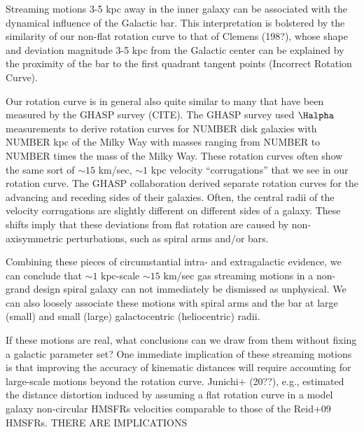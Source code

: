 Streaming motions 3-5 kpc away in the inner galaxy can be associated with the dynamical influence of the Galactic bar. 
This interpretation is bolstered by the similarity of our non-flat rotation curve to that of Clemens (198?), whose shape and deviation magnitude 3-5 kpc from the Galactic center can be explained by the proximity of the bar to the first quadrant tangent points (Incorrect Rotation Curve). 

Our rotation curve is in general also quite similar to many that have been measured by the GHASP survey (CITE). 
The GHASP survey used $\Halpha$ measurements to derive rotation curves for NUMBER disk galaxies with NUMBER kpc of the Milky Way with masses ranging from NUMBER to NUMBER times the mass of the Milky Way.
These rotation curves often show the same sort of $\sim 15$ km/sec, $\sim 1$ kpc velocity ``corrugations'' that we see in our rotation curve. 
The GHASP collaboration derived separate rotation curves for the advancing and receding sides of their galaxies.
Often, the central radii of the velocity corrugations are slightly different on different sides of a galaxy.
These shifts imply that these deviations from flat rotation are caused by non-axisymmetric perturbations, such as spiral arms and/or bars.

Combining these pieces of circumstantial intra- and extragalactic evidence, we can conclude that $\sim 1$ kpc-scale $\sim 15$ km/sec gas streaming motions in a non-grand design spiral galaxy can not immediately be dismissed as unphysical. 
We can also loosely associate these motions with spiral arms and the bar at large (small) and small (large) galactocentric (heliocentric) radii.

If these motions are real, what conclusions can we draw from them without fixing a galactic parameter set? One immediate implication of these streaming motions is that improving the accuracy of kinematic distances will require accounting for large-scale motions beyond the rotation curve. Junichi+ (20??), e.g., estimated the distance distortion induced by assuming a flat rotation curve in a model galaxy non-circular HMSFRs velocities comparable to those of the Reid+09 HMSFRs. 
THERE ARE IMPLICATIONS

